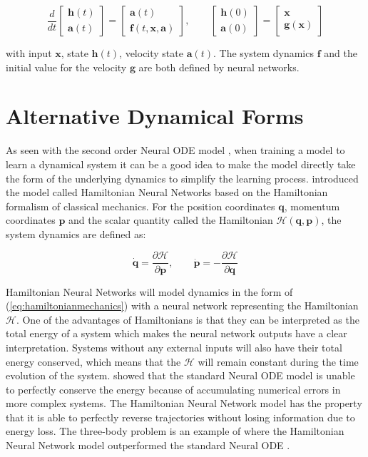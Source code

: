 \documentclass[12pt,a4paper]{book}
\begin{document}
\begin{equation}
    \frac{d}{d t} \begin{bmatrix} \bm{h}(t) \\ \bm{a}(t) \end{bmatrix} = \begin{bmatrix} \bm{a}(t) \\ \bm{f}(t, \bm{x}, \bm{a}) \end{bmatrix},
    \qquad \begin{bmatrix} \bm{h}(0) \\ \bm{a}(0) \end{bmatrix} = \begin{bmatrix} \bm{x} \\ \bm{g}(\bm{x}) \end{bmatrix}
\end{equation}

\noindent with input $\bm{x}$, state $\bm{h}(t)$, velocity state $\bm{a}(t)$. The system dynamics $\bm{f}$ and the initial value for the velocity $\bm{g}$ are both defined by neural networks.

\section{Alternative Dynamical Forms}

As seen with the second order Neural ODE model \citep{sonode}, when training a model to learn a dynamical system it can be a good idea to make the model directly take the form of the underlying dynamics to simplify the learning process. \cite{hamiltoniannode} introduced the model called Hamiltonian Neural Networks based on the Hamiltonian formalism of classical mechanics. For the position coordinates $\bm{q}$, momentum coordinates $\bm{p}$ and the scalar quantity called the Hamiltonian $\mathcal{H}(\bm{q}, \bm{p})$, the system dynamics are defined as:

\begin{equation}
    \dot{\bm{q}} = \frac{\partial \mathcal{H}}{\partial \bm{p}},
    \qquad \dot{\bm{p}} = - \frac{\partial \mathcal{H}}{\partial \bm{q}}
    \label{eq:hamiltonianmechanics}
\end{equation}

Hamiltonian Neural Networks will model dynamics in the form of (\ref{eq:hamiltonianmechanics}) with a neural network representing the Hamiltonian $\mathcal{H}$. One of the advantages of Hamiltonians is that they can be interpreted as the total energy of a system which makes the neural network outputs have a clear interpretation. Systems without any external inputs will also have their total energy conserved, which means that the $\mathcal{H}$ will remain constant during the time evolution of the system. \cite{hamiltoniannode} showed that the standard Neural ODE model is unable to perfectly conserve the energy because of accumulating numerical errors in more complex systems. The Hamiltonian Neural Network model has the property that it is able to perfectly reverse trajectories without losing information due to energy loss. The three-body problem is an example of where the Hamiltonian Neural Network model outperformed the standard Neural ODE \citep{hamiltoniannode}.
\end{document}
